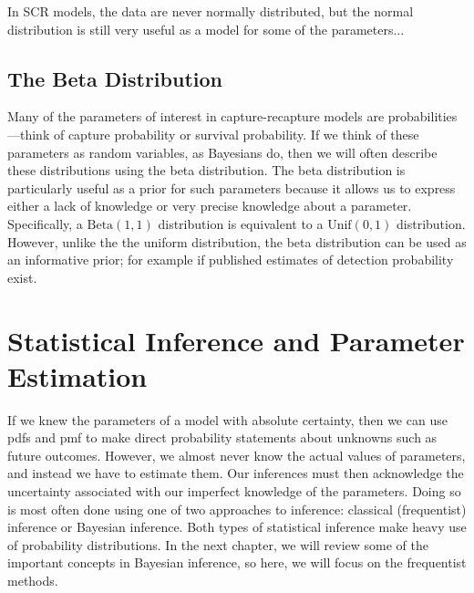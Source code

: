 In SCR models, the data are never normally distributed, but the normal
distribution is still very useful as a model for some of the
parameters...

\subsection{The Beta Distribution}

Many of the parameters of interest in capture-recapture models are
probabilities---think of capture probability or survival
probability. If we think of these parameters as random variables,
as Bayesians do, then we will often describe these distributions using
the beta distribution. The beta distribution is particularly useful as
a prior for such parameters because it allows us to express either a
lack of knowledge or very precise knowledge about a
parameter. Specifically, a $\text{Beta}(1,1)$ distribution is
equivalent to a $\text{Unif}(0, 1)$ distribution. However, unlike the
the uniform distribution, the beta distribution can be used as an
informative prior; for example if published estimates of detection
probability exist.








\section{Statistical Inference and Parameter Estimation}

If we knew the parameters of a model with absolute certainty, then
we can use pdfs and pmf to make direct
probability statements about unknowns such as future outcomes. However, we
almost never know the actual values of parameters, and instead we have
to estimate them. Our inferences must then acknowledge the uncertainty
associated with our imperfect knowledge of the parameters. Doing so is
most often done using one of two approaches to inference:
classical (frequentist) inference or Bayesian
inference. Both types of statistical inference make heavy use of
probability distributions. In the next chapter, we will review some of
the important concepts in Bayesian inference, so here, we will
focus on the frequentist methods.

